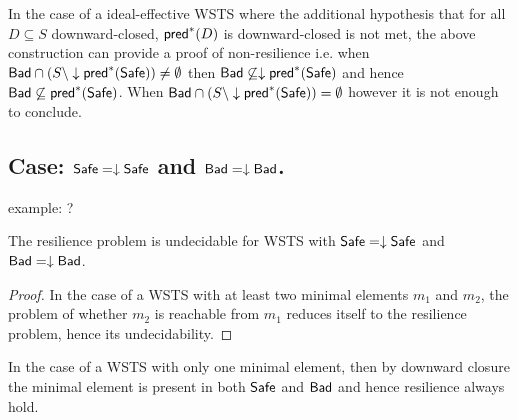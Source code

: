 In the case
of a ideal-effective WSTS 
where
the additional hypothesis that
for all $D \subseteq S$ downward-closed, $\textsf{pred}^*(D)$ is downward-closed
is not met,
the above construction
can provide a proof
of non-resilience
i.e. when
$\textsf{Bad} \cap (S \setminus \downarrow\textsf{pred}^*(\textsf{Safe})) \neq \emptyset$
then
$\textsf{Bad} \not\subseteq \downarrow\textsf{pred}^*(\textsf{Safe})$
and hence
$\textsf{Bad} \not\subseteq \textsf{pred}^*(\textsf{Safe})$.
When $\textsf{Bad} \cap (S \setminus \downarrow\textsf{pred}^*(\textsf{Safe})) = \emptyset$
however
it is not enough to conclude.





\subsection{Case: $\textsf{Safe}=\downarrow \textsf{Safe}$ and $\textsf{Bad}=\downarrow \textsf{Bad}$.}

example: ?


\begin{theorem}\label{down-down}
The resilience problem is undecidable for WSTS with
$\textsf{Safe}=\downarrow \textsf{Safe}$
and $\textsf{Bad}=\downarrow \textsf{Bad}$.
\end{theorem}

\begin{proof}
In the case of a WSTS with at least two minimal elements $m_1$ and $m_2$, the problem of whether $m_2$ is reachable from $m_1$ reduces itself to the resilience problem, hence its undecidability.  
\end{proof}

In the case of a WSTS with only one minimal element,  
then by downward closure the minimal element is present in both $\textsf{Safe}$ and $\textsf{Bad}$ and hence resilience always hold.



